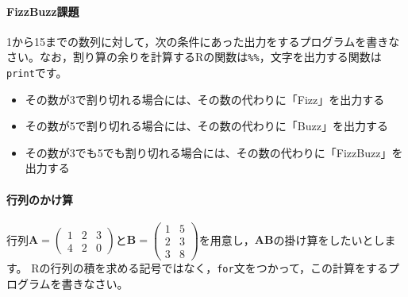 \documentclass{ltjsbook}
\begin{document}
\paragraph{FizzBuzz課題}
1から15までの数列に対して，次の条件にあった出力をするプログラムを書きなさい。なお，割り算の余りを計算するRの関数は\verb|%%|，文字を出力する関数は\verb|print|です。
\begin{itemize}
	\item その数が3で割り切れる場合には、その数の代わりに「Fizz」を出力する
	\item その数が5で割り切れる場合には、その数の代わりに「Buzz」を出力する
	\item その数が3でも5でも割り切れる場合には、その数の代わりに「FizzBuzz」を出力する
\end{itemize}

\paragraph{行列のかけ算}
行列$\bm{A} = \begin{pmatrix}1&2&3\\4&2&0\end{pmatrix}$と$\bm{B}=\begin{pmatrix}1&5\\2&3\\3&8\end{pmatrix}$を用意し，$\bm{AB}$の掛け算をしたいとします。
Rの行列の積を求める記号ではなく，\verb|for|文をつかって，この計算をするプログラムを書きなさい。
\end{document}
